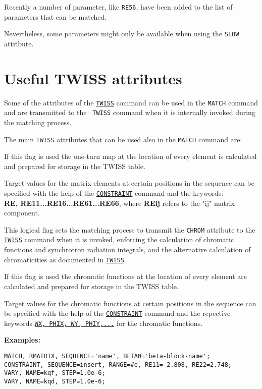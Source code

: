 Recently a number of parameter, like {\tt RE56}, have been added to the
list of parameters that can be matched. 

Nevertheless, some parameters might only be available when using the
{\tt SLOW} attribute.
 
\section{Useful TWISS attributes}

Some of the attributes of the \hyperref[chap:twiss]{\tt TWISS} command
can be used in the {\tt MATCH} command and are transmitted to the {\tt
  TWISS} command when it is internally invoked during the matching process. 

The main {\tt TWISS} attributes that can be used also in the {\tt MATCH}
command are:

\begin{madlist}
   If this flag is used the one-turn map at the location of every
  element is calculated and prepared for storage in the TWISS table.
 
  Target values for the matrix elements at certain positions in the
  sequence can be specified with the help of the
  \hyperref[sec:constraint]{\tt CONSTRAINT} command and the keywords:\\
  \textbf{RE, RE11...RE16...RE61...RE66}, where \textbf{REij} refers to
  the "ij" matrix component.
  

   This logical flag sets the matching process to transmit
  the {\tt CHROM} attribute to the \hyperref[chap:twiss]{\tt TWISS}
  command when it is invoked, enforcing the calculation of chromatic
  functions and synchrotron radiation integrals, and the alternative
  calculation of chromaticities as documented in
  \hyperref[chap:twiss]{\tt TWISS}.

  If this flag is used the chromatic functions at the location of
  every element are calculated and prepared for storage in the TWISS
  table. 
  
  Target values for the chromatic functions at certain positions in the
  sequence can be specified with the help of the
  \hyperref[sec:constraint]{\tt CONSTRAINT} command and the repective keywords
  \hyperref[subsec:tables-chrom]{\tt WX, PHIX, WY, PHIY,...} for the
  chromatic functions. 
\end{madlist}


{\bf Examples:}

\begin{verbatim}
MATCH, RMATRIX, SEQUENCE='name', BETA0='beta-block-name';
CONSTRAINT, SEQUENCE=insert, RANGE=#e, RE11=-2.808, RE22=2.748;
VARY, NAME=kqf, STEP=1.0e-6;
VARY, NAME=kqd, STEP=1.0e-6;
\end{verbatim}

